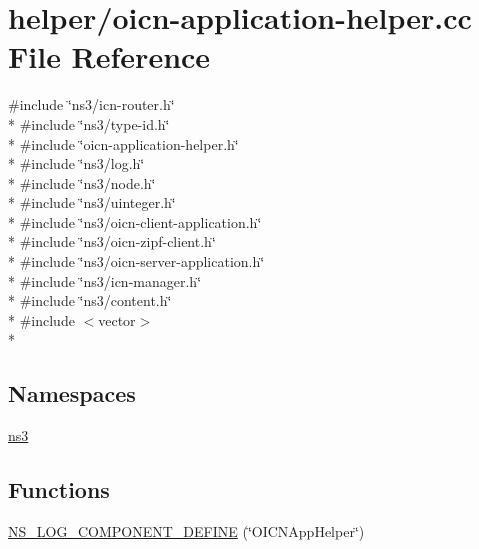 \hypertarget{oicn-application-helper_8cc}{\section{helper/oicn-\/application-\/helper.cc File Reference}
\label{oicn-application-helper_8cc}
}
{\ttfamily \#include \char`\"{}ns3/icn-\/router.\-h\char`\"{}}\\*
{\ttfamily \#include \char`\"{}ns3/type-\/id.\-h\char`\"{}}\\*
{\ttfamily \#include \char`\"{}oicn-\/application-\/helper.\-h\char`\"{}}\\*
{\ttfamily \#include \char`\"{}ns3/log.\-h\char`\"{}}\\*
{\ttfamily \#include \char`\"{}ns3/node.\-h\char`\"{}}\\*
{\ttfamily \#include \char`\"{}ns3/uinteger.\-h\char`\"{}}\\*
{\ttfamily \#include \char`\"{}ns3/oicn-\/client-\/application.\-h\char`\"{}}\\*
{\ttfamily \#include \char`\"{}ns3/oicn-\/zipf-\/client.\-h\char`\"{}}\\*
{\ttfamily \#include \char`\"{}ns3/oicn-\/server-\/application.\-h\char`\"{}}\\*
{\ttfamily \#include \char`\"{}ns3/icn-\/manager.\-h\char`\"{}}\\*
{\ttfamily \#include \char`\"{}ns3/content.\-h\char`\"{}}\\*
{\ttfamily \#include $<$vector$>$}\\*
\subsection*{Namespaces}
\begin{DoxyCompactItemize}
\item 
\hyperlink{namespacens3}{ns3}
\end{DoxyCompactItemize}
\subsection*{Functions}
\begin{DoxyCompactItemize}
\item 
\hyperlink{oicn-application-helper_8cc_a619ef641822f605d852bad6926ce2041}{N\-S\-\_\-\-L\-O\-G\-\_\-\-C\-O\-M\-P\-O\-N\-E\-N\-T\-\_\-\-D\-E\-F\-I\-N\-E} (\char`\"{}O\-I\-C\-N\-App\-Helper\char`\"{})
\end{DoxyCompactItemize}



